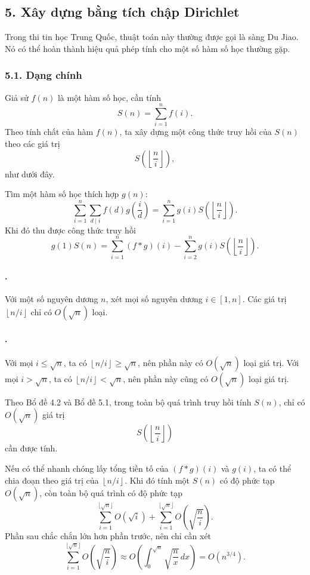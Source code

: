 \documentclass[11pt]{article}
\begin{document}
\subsection*{5. Xây dựng bằng tích chập Dirichlet}

Trong thi tin học Trung Quốc, thuật toán này thường được gọi là sàng Du Jiao.
Nó có thể hoàn thành hiệu quả phép tính cho một số hàm số học thường gặp.

\subsubsection*{5.1. Dạng chính}

Giả sử \(f(n)\) là một hàm số học, cần tính
\[
  S(n)=\sum_{i=1}^{n} f(i).
\]
Theo tính chất của hàm \(f(n)\), ta xây dựng một công thức truy hồi của
\(S(n)\) theo các giá trị
\[
  S\left(\left\lfloor\frac{n}{i}\right\rfloor\right),
\]
như dưới đây.

Tìm một hàm số học thích hợp \(g(n)\):
\[
  \sum_{i=1}^{n}\sum_{d\mid i} f(d)g\left(\frac{i}{d}\right)
  =
  \sum_{i=1}^{n}g(i)S\left(\left\lfloor\frac{n}{i}\right\rfloor\right).
\]
Khi đó thu được công thức truy hồi
\[
  g(1)S(n)
  =
  \sum_{i=1}^{n}(f*g)(i)
  -
  \sum_{i=2}^{n}g(i)S\left(\left\lfloor\frac{n}{i}\right\rfloor\right).
\]

\paragraph{.}
Với một số nguyên dương \(n\), xét mọi số nguyên dương \(i\in[1,n]\). Các giá
trị \(\left\lfloor n/i\right\rfloor\) chỉ có \(O(\sqrt n)\) loại.

\paragraph{.}
Với mọi \(i\le\sqrt n\), ta có \(\left\lfloor n/i\right\rfloor\ge\sqrt n\),
nên phần này có \(O(\sqrt n)\) loại giá trị. Với mọi \(i>\sqrt n\), ta có
\(\left\lfloor n/i\right\rfloor<\sqrt n\), nên phần này cũng có
\(O(\sqrt n)\) loại giá trị.

Theo Bổ đề 4.2 và Bổ đề 5.1, trong toàn bộ quá trình truy hồi tính \(S(n)\),
chỉ có \(O(\sqrt n)\) giá trị
\[
  S\left(\left\lfloor\frac{n}{i}\right\rfloor\right)
\]
cần được tính.

Nếu có thể nhanh chóng lấy tổng tiền tố của \((f*g)(i)\) và \(g(i)\), ta có
thể chia đoạn theo giá trị của \(\left\lfloor n/i\right\rfloor\). Khi đó tính
một \(S(n)\) có độ phức tạp \(O(\sqrt n)\), còn toàn bộ quá trình có độ phức
tạp
\[
  \sum_{i=1}^{\lfloor\sqrt n\rfloor} O(\sqrt i)
  + \sum_{i=1}^{\lfloor\sqrt n\rfloor}
  O\left(\sqrt{\frac{n}{i}}\right).
\]
Phần sau chắc chắn lớn hơn phần trước, nên chỉ cần xét
\[
  \sum_{i=1}^{\lfloor\sqrt n\rfloor}
  O\left(\sqrt{\frac{n}{i}}\right)
  \approx
  O\left(\int_0^{\sqrt n}\sqrt{\frac{n}{x}}\,dx\right)
  = O(n^{3/4}).
\]
\end{document}
